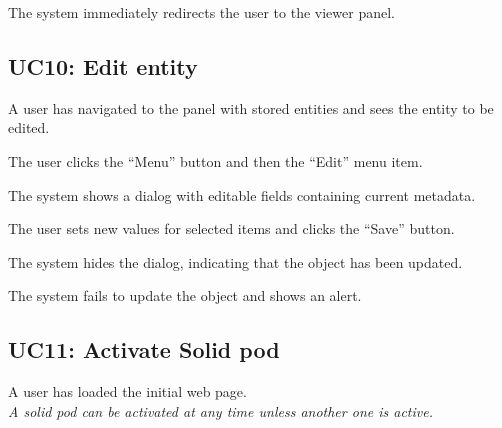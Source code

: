 \begin{ucitemize}
\item The system immediately redirects the user to the viewer panel.
\end{ucitemize}

\subsection{UC10: Edit entity}\label{sssec:uc-edit-entity}


\begin{ucitemize}
\item A user has navigated to the panel with stored entities and sees the entity to be edited.
\end{ucitemize}


\begin{ucenumerate}
\item The user clicks the ``Menu'' button and then the ``Edit'' menu item.
\item The system shows a dialog with editable fields containing current metadata.
\item The user sets new values for selected items and clicks the ``Save'' button.
\end{ucenumerate}


\begin{ucitemize}
\item The system hides the dialog, indicating that the object has been updated.
\end{ucitemize}


\begin{ucitemize}
\item The system fails to update the object and shows an alert.
\end{ucitemize}

\subsection{UC11: Activate Solid pod}\label{sssec:uc-activate-solid}


\begin{ucitemize}
\item A user has loaded the initial web page.\\[0.2em]
\emph{A \acs{solid} pod can be activated at any time unless another one is active.}
\end{ucitemize}

